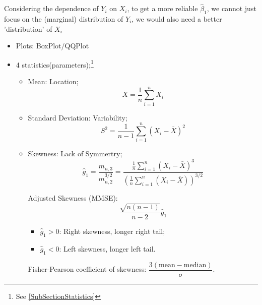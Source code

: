     Considering the dependence of $ Y_i $ on $ X_i $, to get a more reliable $ \hat{\beta }_1 $, we cannot just focus on the (marginal) distribution of $ Y_i $, we would also need a better 'distribution' of $ X_i $
    \begin{itemize}[topsep=2pt,itemsep=2pt]
        \item Plots: BoxPlot/QQPlot
        \item 4 statistics(parameters);\footnote{See \autoref{SubSectionStatistics}}
        \begin{itemize}[topsep=2pt,itemsep=2pt]
            \item Mean: Location;
            \begin{equation}
                \bar{X}=\dfrac{1}{n}\sum_{i=1}^nX_i 
            \end{equation}
            \item Standard Deviation: Variability;
            \begin{equation}
                S^2=\dfrac{1}{n-1}\sum_{i=1}^n(X_i-\bar{X}) ^2
            \end{equation}
            
            
            \item Skewness: Lack of Symmertry;
            \begin{equation}
                \hat{g}_1=\dfrac{m_{n,3}}{m_{n,2}^{3/2}}=\dfrac{\frac{1}{n}\sum\limits_{i=1}^n(X_i-\bar{X})^3}{\left( \frac{1}{n}\sum\limits_{i=1}^n(X_i-\bar{X}) \right)^{3/2}} 
            \end{equation}

            Adjusted Skewness (MMSE):
            \begin{equation}
                \dfrac{\sqrt{n(n-1)}}{n-2}\hat{g}_1 
            \end{equation}
            
            \begin{itemize}[topsep=2pt,itemsep=2pt]
                \item $ \hat{g}_1>0 $: Right skewness, longer right tail;
                \item $ \hat{g}_1<0 $: Left skewness, longer left tail.
            \end{itemize}
            
                
            Fisher-Pearson coefficient of skewness: $ \dfrac{3(\mathrm{mean}-\mathrm{median})}{\sigma } $.



\end{itemize}
\end{itemize}
